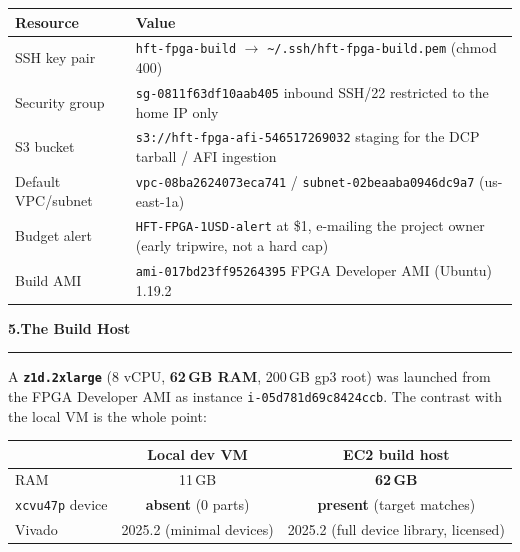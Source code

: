 \documentclass[10pt,a4paper]{article}
\newcommand{\sectionrule}{\par\nobreak\vspace{1pt}\textcolor{rulegray}{\rule{\linewidth}{0.8pt}}\par\vspace{1pt}}
\newcommand{\fpath}[1]{\texttt{\textcolor{hdrblue}{#1}}}
\newcommand{\sechead}[2]{{\large\bfseries\color{hdrblue} #1\quad #2}\sectionrule}
\begin{document}
\begin{center}\small
\begin{tabularx}{\linewidth}{@{}lX@{}}
\toprule
\textbf{Resource} & \textbf{Value} \\
\midrule
SSH key pair      & \fpath{hft-fpga-build} $\rightarrow$ \fpath{\textasciitilde/.ssh/hft-fpga-build.pem} (chmod 400) \\
Security group    & \fpath{sg-0811f63df10aab405} \textendash{} inbound SSH/22 restricted to the home IP only \\
S3 bucket         & \fpath{s3://hft-fpga-afi-546517269032} \textendash{} staging for the DCP tarball / AFI ingestion \\
Default VPC/subnet& \fpath{vpc-08ba2624073eca741} / \fpath{subnet-02beaaba0946dc9a7} (us-east-1a) \\
Budget alert      & \fpath{HFT-FPGA-1USD-alert} at \$1, e-mailing the project owner (early tripwire, not a hard cap) \\
Build AMI         & \fpath{ami-017bd23ff95264395} \textendash{} FPGA Developer AMI (Ubuntu) 1.19.2 \\
\bottomrule
\end{tabularx}
\end{center}

\sechead{5.}{The Build Host}

A \textbf{\fpath{z1d.2xlarge}} (8 vCPU, \textbf{62\,GB RAM}, 200\,GB gp3 root)
was launched from the FPGA Developer AMI as instance
\fpath{i-05d781d69c8424ccb}. The contrast with the local VM is the whole point:

\begin{center}\small
\begin{tabular}{@{}lcc@{}}
\toprule
 & \textbf{Local dev VM} & \textbf{EC2 build host} \\
\midrule
RAM            & 11\,GB            & \textbf{62\,GB} \\
\fpath{xcvu47p} device & \textbf{absent} (0 parts) & \textbf{present} (target matches) \\
Vivado         & 2025.2 (minimal devices) & 2025.2 (full device library, licensed) \\
\bottomrule
\end{tabular}
\end{center}
\end{document}
